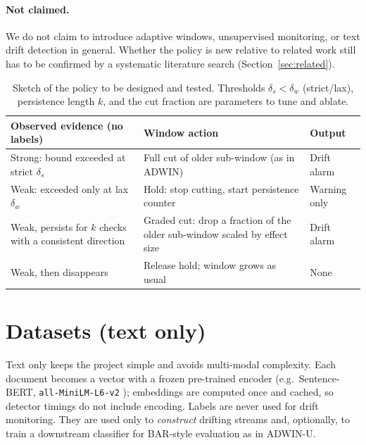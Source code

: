\documentclass[11pt,a4paper]{article}
\begin{document}
\paragraph{Not claimed.} We do not claim to introduce adaptive windows, unsupervised monitoring, or text drift detection in general. Whether the policy is new relative to related work still has to be confirmed by a systematic literature search (Section~\ref{sec:related}).

\begin{table}[h]
\centering
\small
\caption{Sketch of the policy to be designed and tested. Thresholds $\delta_s<\delta_w$ (strict/lax), persistence length $k$, and the cut fraction are parameters to tune and ablate.}
\label{tab:policy}
\begin{tabular}{p{4.6cm}p{5.2cm}p{3.3cm}}
\toprule
Observed evidence (no labels) & Window action & Output \\
\midrule
Strong: bound exceeded at strict $\delta_s$ & Full cut of older sub-window (as in ADWIN) & Drift alarm \\
Weak: exceeded only at lax $\delta_w$ & Hold: stop cutting, start persistence counter & Warning only \\
Weak, persists for $k$ checks with a consistent direction & Graded cut: drop a fraction of the older sub-window scaled by effect size & Drift alarm \\
Weak, then disappears & Release hold; window grows as usual & None \\
\bottomrule
\end{tabular}
\end{table}

\section{Datasets (text only)}

Text only keeps the project simple and avoids multi-modal complexity. Each document becomes a vector with a frozen pre-trained encoder (e.g.\ Sentence-BERT, \texttt{all-MiniLM-L6-v2} \cite{reimers2019}); embeddings are computed once and cached, so detector timings do not include encoding. Labels are never used for drift monitoring. They are used only to \emph{construct} drifting streams and, optionally, to train a downstream classifier for BAR-style evaluation as in ADWIN-U.
\end{document}
